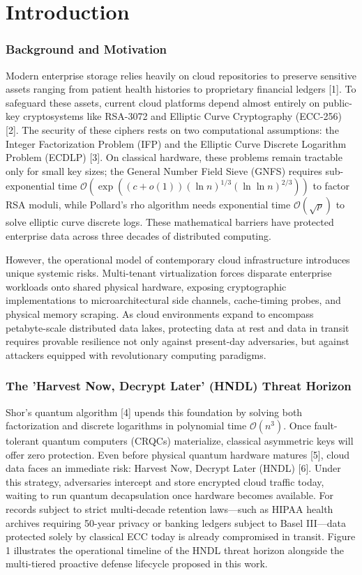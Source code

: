 \documentclass[5p,times]{elsarticle}
\begin{document}
\FloatBarrier
\section{Introduction}


\subsubsection{Background and Motivation}

Modern enterprise storage relies heavily on cloud repositories to preserve sensitive assets ranging from patient health histories to proprietary financial ledgers [1]. To safeguard these assets, current cloud platforms depend almost entirely on public-key cryptosystems like RSA-3072 and Elliptic Curve Cryptography (ECC-256) [2]. The security of these ciphers rests on two computational assumptions: the Integer Factorization Problem (IFP) and the Elliptic Curve Discrete Logarithm Problem (ECDLP) [3]. On classical hardware, these problems remain tractable only for small key sizes; the General Number Field Sieve (GNFS) requires sub-exponential time $\mathcal{O}(\exp((c+o(1))(\ln n)^{1/3}(\ln \ln n)^{2/3}))$ to factor RSA moduli, while Pollard's rho algorithm needs exponential time $\mathcal{O}(\sqrt{p})$ to solve elliptic curve discrete logs. These mathematical barriers have protected enterprise data across three decades of distributed computing.

However, the operational model of contemporary cloud infrastructure introduces unique systemic risks. Multi-tenant virtualization forces disparate enterprise workloads onto shared physical hardware, exposing cryptographic implementations to microarchitectural side channels, cache-timing probes, and physical memory scraping. As cloud environments expand to encompass petabyte-scale distributed data lakes, protecting data at rest and data in transit requires provable resilience not only against present-day adversaries, but against attackers equipped with revolutionary computing paradigms.


\subsubsection{The 'Harvest Now, Decrypt Later' (HNDL) Threat Horizon}

Shor's quantum algorithm [4] upends this foundation by solving both factorization and discrete logarithms in polynomial time $\mathcal{O}(n^3)$. Once fault-tolerant quantum computers (CRQCs) materialize, classical asymmetric keys will offer zero protection. Even before physical quantum hardware matures [5], cloud data faces an immediate risk: Harvest Now, Decrypt Later (HNDL) [6]. Under this strategy, adversaries intercept and store encrypted cloud traffic today, waiting to run quantum decapsulation once hardware becomes available. For records subject to strict multi-decade retention laws---such as HIPAA health archives requiring 50-year privacy or banking ledgers subject to Basel III---data protected solely by classical ECC today is already compromised in transit. Figure 1 illustrates the operational timeline of the HNDL threat horizon alongside the multi-tiered proactive defense lifecycle proposed in this work.
\end{document}
